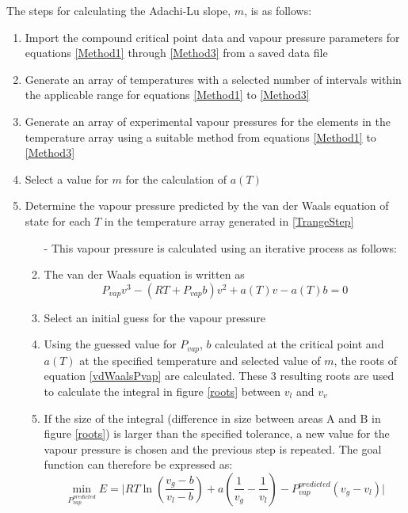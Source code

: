 			The steps for calculating the Adachi-Lu slope, $m$, is as follows:
			\begin{enumerate}
				\item Import the compound critical point data and vapour pressure parameters for equations \ref{Method1} through \ref{Method3}  from a saved data file
				\item Generate an array of temperatures with a selected number of intervals within the applicable range for equations \ref{Method1} to \ref{Method3}	 \label{TrangeStep}
				\item Generate an array of experimental vapour pressures for the elements in the temperature array using a suitable method from equations \ref{Method1} to \ref{Method3}
				\item Select a value for $m$ for the calculation of $a\left(T\right)$ \label{mSelectStep}
				\item Determine the vapour pressure predicted by the van der Waals equation of state for each $T$ in the temperature array generated in \ref{TrangeStep}
				\begin{enumerate}
					\item[-] This vapour pressure is calculated using an iterative process as follows:
					\item The van der Waals equation is written as 
						\begin{equation}
							P_{vap}v^{3} - \left(RT +P_{vap}b\right)v^{2} + a\left(T\right)v -a\left(T\right)b = 0 \label{vdWaalsPvap}
						\end{equation}
					\item Select an initial guess for the vapour pressure
					\item Using the guessed value for $P_{vap}$, $b$ calculated at the critical point and $a\left(T\right)$ at the specified temperature and selected value of $m$, the roots of equation \ref{vdWaalsPvap} are calculated. These 3 resulting roots are used to calculate the integral in figure \ref{roots} between $v_{l}$ and $v_{v}$
					\item If the size of the integral (difference in size between areas A and B in figure \ref{roots}) is larger than the specified tolerance, a new value for the vapour pressure is chosen and the previous step is repeated. The goal function can therefore be expressed as:
							\begin{equation}
								\min_{P_{vap}^{predicted}} E =  \vert RT \ln \left( \frac{v_{g}-b}{v_{l} -b}\right) + a\left(\frac{1}{v_{g}}- \frac{1}{v_{l}} \right)- P_{vap}^{predicted}\left(v_{g}-v_{l}\right)\vert \label{GoalFunctionPvap}

\end{equation}
\end{enumerate}
\end{enumerate}
